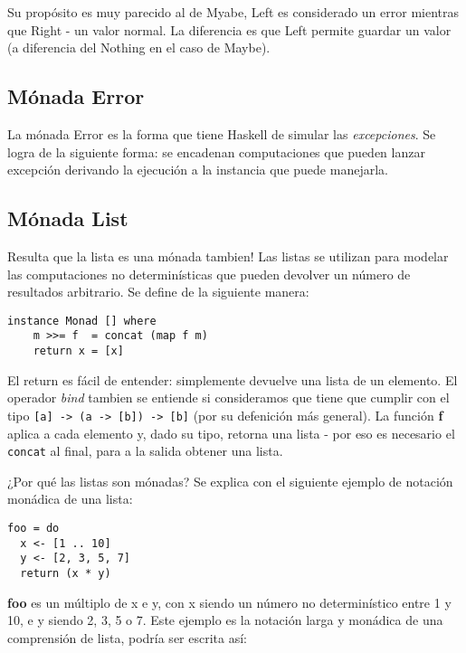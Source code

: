Su propósito es muy parecido al de Myabe, Left es considerado un error
mientras que Right - un valor normal. La diferencia es que Left permite
guardar un valor (a diferencia del Nothing en el caso de Maybe).


\subsection{Mónada Error} %
\label{sub:m_nada_error}

La mónada Error es la forma que tiene Haskell de simular las
\textit{excepciones}. Se logra de la siguiente forma: se encadenan
computaciones que pueden lanzar excepción derivando la ejecución a la
instancia que puede manejarla.



\subsection{Mónada List} %
\label{sub:m_nada_list}


Resulta que la lista es una mónada tambien! Las listas se utilizan para modelar
las computaciones no determinísticas que pueden devolver un número de
resultados arbitrario. Se define de la siguiente manera:

\begin{lstlisting}
instance Monad [] where
    m >>= f  = concat (map f m)
    return x = [x]
\end{lstlisting}

El return es fácil de entender: simplemente devuelve una lista de un elemento.
El operador \textit{bind} tambien se entiende si consideramos que tiene que
cumplir con el tipo \lstinline$[a] -> (a -> [b]) -> [b]$ (por su defenición
más general). La función \textbf{f} aplica a cada elemento y, dado su tipo,
retorna una lista - por eso es necesario el \lstinline$concat$ al final, para
a la salida obtener una lista.

¿Por qué las listas son mónadas? Se explica con el siguiente ejemplo de
notación monádica de una lista:

\begin{lstlisting}
foo = do
  x <- [1 .. 10]
  y <- [2, 3, 5, 7]
  return (x * y)
\end{lstlisting}

\textbf{foo} es un múltiplo de x e y, con x siendo un número no determinístico
entre 1 y 10, e y siendo 2, 3, 5 o 7. Este ejemplo es la notación larga y
monádica de una comprensión de lista, podría ser escrita así:

